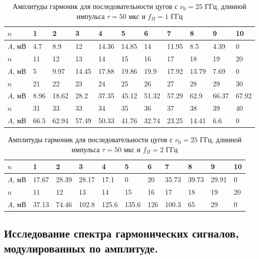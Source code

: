 \documentclass[a4paper,12pt]{article} %
\begin{document}
\begin{table}[h]
\begin{center}
\begin{tabularx}{\textwidth}{|l|Y|Y|Y|Y|Y|Y|Y|Y|Y|Y|}
\hline
$n$ & 1 & 2 & 3 & 4 & 5 &6 & 7 & 8 & 9 & 10 \\ \hline
$A$, мВ & 4.7&8.9&12&14.36&14.85&14&11.95&8.5&4.39&0 \\ \hline
$n$ & 11 & 12 & 13 & 14 & 15 & 16 & 17 & 18 & 19 & 20 \\ \hline
$A$, мВ & 5&9.97&14.45&17.88&19.86&19.9&17.92&13.79&7.69&0 \\ \hline
$n$ & 21 & 22 & 23 & 24 & 25 & 26 & 27 & 28 & 29 & 30 \\ \hline
$A$, мВ & 8.96&18.62&28.2&37.35&45.12&51.32&57.29&62.9&66.37&67.92 \\ \hline
$n$ & 31 & 33 & 33 & 34 & 35 & 36 & 37 & 38 & 39 & 40 \\ \hline
$A$, мВ & 66.5&62.94&57.49&50.33&41.76&32.74&23.25&14.41&6.6&0 \\ \hline
\end{tabularx}
\caption{Амплитуды гармоник для последовательности цугов с $\nu_0 = 25$ ГГц, длинной импульса $\tau = 50$ мкс и $f_\Pi = 1$ ГГц}
\end{center}
\end{table}

\begin{table}[h]
\begin{center}
\begin{tabularx}{\textwidth}{|l|Y|Y|Y|Y|Y|Y|Y|Y|Y|Y|}
\hline
$n$ & 1 & 2 & 3 & 4 & 5 &6 & 7 & 8 & 9 & 10 \\ \hline
$A$, мВ & 17.67&28.39&28.17&17.1&0&20&35.73&39.73&29.91&0 \\ \hline
$n$ & 11 & 12 & 13 & 14 & 15 & 16 & 17 & 18 & 19 & 20 \\ \hline
$A$, мВ & 37.13&74.46&102.8&125.6&135.6&126&100.3&65&29&0 \\ \hline
\end{tabularx}
\caption{Амплитуды гармоник для последовательности цугов с $\nu_0 = 25$ ГГц, длинной импульса $\tau = 50$ мкс и $f_\Pi = 2$ ГГц}
\end{center}
\end{table}

\subsection{Исследование спектра гармонических сигналов, модулированных по амплитуде.}
\end{document}
